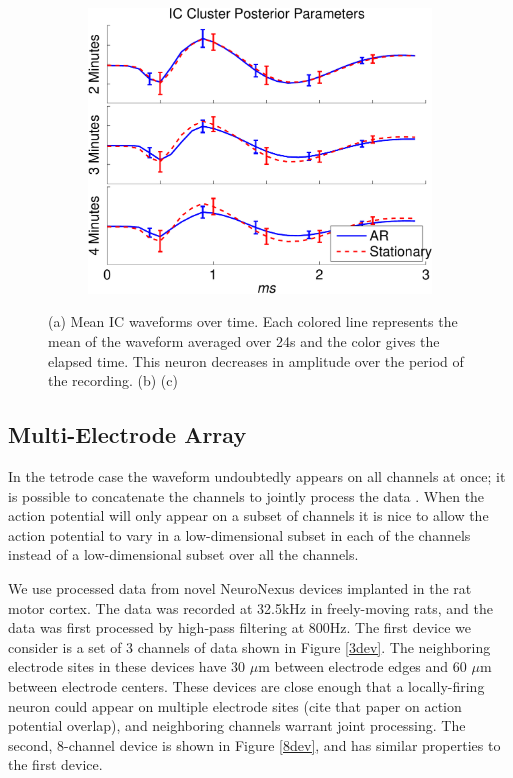 \begin{center}
\begin{figure}
\begin{subfigure}[b]{.33\textwidth}
\includegraphics[width=\textwidth]{../figs/new/ARvsStationary.pdf}
\caption{}
\label{truewaveforms}
\end{subfigure}
\caption{
(a) Mean IC waveforms over time.  Each colored line represents the mean of the waveform averaged over 24s and the color gives the elapsed time.  This neuron decreases in amplitude over the period of the recording. 
(b) 
(c) }
\end{figure}
\end{center}

\subsection{Multi-Electrode Array} \label{sub:multi}

In the tetrode case the waveform undoubtedly appears on all channels at once; it is possible to concatenate the channels to jointly process the data \cite{wood2009}.  When the action potential will only appear on a subset of channels it is nice to allow the action potential to vary in a low-dimensional subset in each of the channels instead of a low-dimensional subset over all the channels. \cite{Prentice2011}

We use processed data from novel NeuroNexus devices implanted in the rat motor cortex.  The data was recorded at 32.5kHz in freely-moving rats, and the data was first processed by high-pass filtering at 800Hz.  The first device we consider is a set of 3 channels of data shown in Figure \ref{3dev}.  The neighboring electrode sites in these devices have 30 $\mu$m between electrode edges and 60 $\mu$m between electrode centers.  These devices are close enough that a locally-firing neuron could appear on multiple electrode sites (cite that paper on action potential overlap), and neighboring channels warrant joint processing.  The second, 8-channel device is shown in Figure \ref{8dev}, and has similar properties to the first device.

